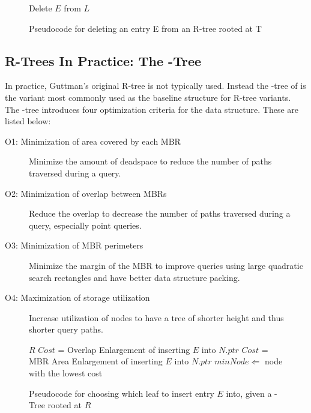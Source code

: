 \begin{figure}[t]
\begin{algorithmic}
	\State {}
	\State Delete $E$ from $L$
	\State {}
\EndFunction
\end{algorithmic}
\caption{Pseudocode for deleting an entry E from an R-tree rooted at T}
\label{fig:R_Tree_Delete}
\end{figure}


\subsection{R-Trees In Practice: The \rstar-Tree}
\label{sec:variants}
In practice, Guttman's original R-tree is not typically used. Instead the 
\rstar-tree of \cite{beckmannkriegelschneiderseeger90} is the variant most 
commonly used as the baseline structure for R-tree variants. The 
\rstar-tree introduces four optimization criteria for the data structure. 
These are listed below:

\begin{description}
	\item[O1: Minimization of area covered by each MBR] Minimize the amount of 
		deadspace to reduce the number of paths traversed during a query.
	\item[O2: Minimization of overlap between MBRs] Reduce the overlap to decrease the
		number of paths traversed during a query, especially point queries.
	\item[O3: Minimization of MBR perimeters] Minimize the margin of the MBR to 
		improve queries using large quadratic search rectangles and have better 
		data structure packing.
	\item[O4: Maximization of storage utilization] Increase utilization of nodes to 
		have a tree of shorter height and thus shorter query paths.
\end{description}

\begin{figure}[b!]
	\begin{algorithmic}
				\Return $R$
			\Else
						\State $Cost$ = Overlap Enlargement of inserting $E$ into $N.ptr$
					\Else
						\State $Cost$ = MBR Area Enlargement of inserting $E$ into $N.ptr$
					\EndIf
				\EndFor
				\State $minNode \Leftarrow$ node with the lowest cost
			\EndIf
		\EndFunction
	\end{algorithmic}
	\caption{Pseudocode for choosing which leaf to insert entry $E$ into, given a 
	\rstar-Tree rooted at $R$}
	\label{fig:R*-Tree_ChooseLeaf}
\end{figure}

